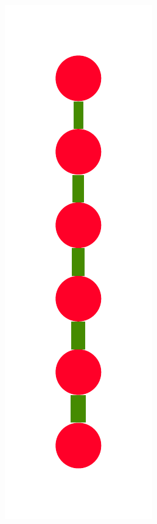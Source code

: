 \documentclass[a4paper,10pt]{article}
\begin{document}
\begin{figure}
{    \includegraphics[scale=.14]{../figures/vector/6-3-recursion-data-3.pdf}
}
\end{figure}
\end{document}

